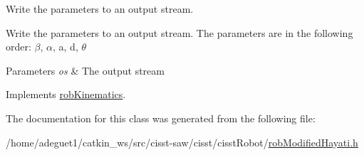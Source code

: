Write the parameters to an output stream. 

Write the parameters to an output stream. The parameters are in the following order\-: $\beta$, $\alpha$, a, d, $\theta$ 
\begin{DoxyParams}{Parameters}
{\em os} & The output stream \\
\hline
\end{DoxyParams}


Implements \hyperlink{classrob_kinematics_afbfe67b8baaed6fdee85bef681f195e1}{rob\-Kinematics}.



The documentation for this class was generated from the following file\-:\begin{DoxyCompactItemize}
\item 
/home/adeguet1/catkin\-\_\-ws/src/cisst-\/saw/cisst/cisst\-Robot/\hyperlink{rob_modified_hayati_8h}{rob\-Modified\-Hayati.\-h}\end{DoxyCompactItemize}
